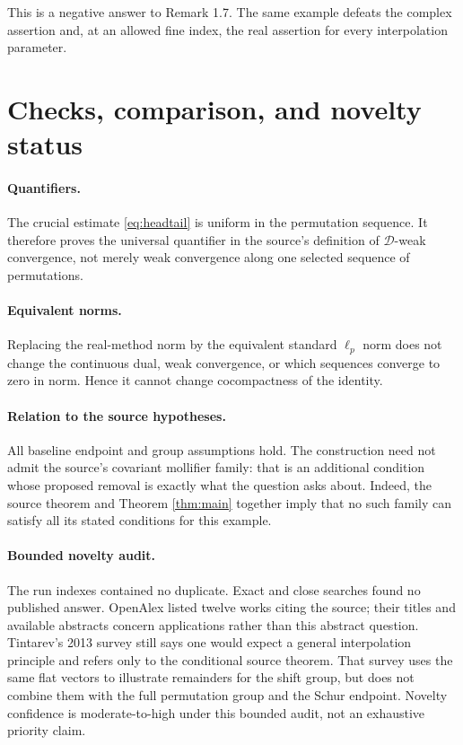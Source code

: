 \documentclass[11pt]{article}
\newcommand{\D}{\mathcal D}
\begin{document}
This is a negative answer to Remark 1.7.  The same example defeats the
complex assertion and, at an allowed fine index, the real assertion for every
interpolation parameter.

\section{Checks, comparison, and novelty status}

\paragraph{Quantifiers.}
The crucial estimate \eqref{eq:headtail} is uniform in the permutation
sequence.  It therefore proves the universal quantifier in the source's
definition of $\D$-weak convergence, not merely weak convergence along one
selected sequence of permutations.

\paragraph{Equivalent norms.}
Replacing the real-method norm by the equivalent standard $\ell_p$ norm does
not change the continuous dual, weak convergence, or which sequences converge
to zero in norm.  Hence it cannot change cocompactness of the identity.

\paragraph{Relation to the source hypotheses.}
All baseline endpoint and group assumptions hold.  The construction need not
admit the source's covariant mollifier family: that is an additional condition
whose proposed removal is exactly what the question asks about.  Indeed, the
source theorem and Theorem \ref{thm:main} together imply that no such family
can satisfy all its stated conditions for this example.

\paragraph{Bounded novelty audit.}
The run indexes contained no duplicate.  Exact and close searches found no
published answer.  OpenAlex listed twelve works citing the source; their titles
and available abstracts concern applications rather than this abstract
question.  Tintarev's 2013 survey \cite{Tintarev} still says one would expect a
general interpolation principle and refers only to the conditional source
theorem.  That survey uses the same flat vectors to illustrate remainders for
the shift group, but does not combine them with the full permutation group and
the Schur endpoint.  Novelty confidence is moderate-to-high under this bounded
audit, not an exhaustive priority claim.
\end{document}
